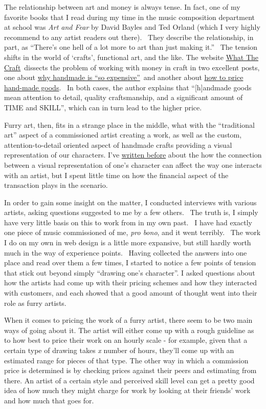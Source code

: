 The relationship between art and money is always tense. In fact, one of
my favorite books that I read during my time in the music composition
department at school was \emph{Art and Fear} by David Bayles and Ted
Orland (which I very highly recommend to any artist readers out there).
~They describe the relationship, in part, as ``There's one hell of a lot
more to art than just making it.'' ~The tension shifts in the world of
`crafts', functional art, and the like. The website
\href{http://whatthecraft.com}{What The Craft}~dissects the problem of
working with money in craft in two excellent posts, one about
\href{http://whatthecraft.com/overpriced-cant-afford-handmade-pricing/}{why
handmade is ``so expensive''}~and another about
\href{http://whatthecraft.com/how-to-pricing/}{how to price hand-made
goods}. ~In both cases, the author explains that ``{[}h{]}andmade goods
mean attention to detail, quality craftsmanship, and a significant
amount of TIME and SKILL'', which can in turn lead to the higher price.

Furry art, then, fits in a strange place in the middle, what with the
``traditional art'' aspect of a commissioned artist creating a work, as
well as the custom, attention-to-detail oriented aspect of handmade
crafts providing a visual representation of our characters. I've
\href{http://adjectivespecies.com/2011/11/23/character-versus-self/}{written
before} about the how the connection between a visual representation of
one's character can affect the way one interacts with an artist, but I
spent little time on how the financial aspect of the transaction plays
in the scenario.

In order to gain some insight on the matter, I conducted interviews with
various artists, asking questions suggested to me by a few others. ~The
truth is, I simply have very little basis on this to work from in my own
past. ~I have had exactly one piece of music commissioned of me,
\emph{pro bono}, and it went terribly. ~The work I do on my own in web
design is a little more expansive, but still hardly worth much in the
way of experience points. ~Having collected the answers into one place
and read over them a few times, I started to notice a few points of
tension that stick out beyond simply ``drawing one's character''. I
asked questions about how the artists had come up with their pricing
schemes and how they interacted with customers, and each showed that a
good amount of thought went into their role as furry artists.

When it comes to pricing the work of a furry artist, there seem to be
two main ways of going about it. The artist will either come up with a
rough guideline as to how best to price their work on an hourly scale -
for example, given that a certain type of drawing takes \emph{x} number
of hours, they'll come up with an estimated range for pieces of that
type. The other way in which a commission price is determined is by
checking prices against their peers and estimating from there. An artist
of a certain style and perceived skill level can get a pretty good idea
of how much they might charge for work by looking at their friends' work
and how much that goes for.

